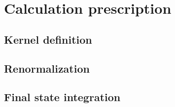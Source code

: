 \section{Calculation prescription}

\subsection{Kernel definition}

\subsection{Renormalization}

\subsection{Final state integration}
